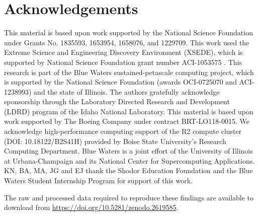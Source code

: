 \section{Acknowledgements}
\label{ack}
This material is based upon work supported by the National Science Foundation under Grants No. 1835593, 1653954, 1658076, and 1229709.
This work used the Extreme Science and Engineering Discovery Environment (XSEDE), which is supported by National Science Foundation grant number ACI-1053575 \cite{Towns2014}.
This research is part of the Blue Waters sustained-petascale computing project, which is supported by the National Science Foundation (awards OCI-0725070 and ACI-1238993) and the state of Illinois. 
The authors gratefully acknowledge sponsorship through the Laboratory Directed Research and Development (LDRD) program of the Idaho National Laboratory.
This material is based upon work supported by The Boeing Company under contract BRT-LO118-0015.
We acknowledge high-performance computing support of the R2 compute cluster (DOI: 10.18122/B2S41H) provided by Boise State University's Research Computing Department.
Blue Waters is a joint effort of the University of Illinois at Urbana-Champaign and its National Center for Supercomputing Applications. 
KN, BA, MA, JG and EJ thank the Shodor Education Foundation and the Blue Waters Student Internship Program for support of this work. 

The raw and processed data required to reproduce these findings are available to download from \href{https://doi.org/10.5281/zenodo.2619585}{https://doi.org/10.5281/zenodo.2619585}. 
